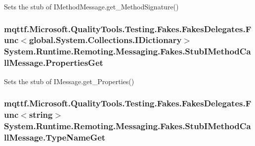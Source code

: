 Sets the stub of I\-Method\-Message.\-get\-\_\-\-Method\-Signature()

\hypertarget{class_system_1_1_runtime_1_1_remoting_1_1_messaging_1_1_fakes_1_1_stub_i_method_call_message_a7240607efeabfb449c6bad358b684064}{
\subsubsection[{Properties\-Get}]{\setlength{\rightskip}{0pt plus 5cm}mqttf.\-Microsoft.\-Quality\-Tools.\-Testing.\-Fakes.\-Fakes\-Delegates.\-Func$<$global.\-System.\-Collections.\-I\-Dictionary$>$ System.\-Runtime.\-Remoting.\-Messaging.\-Fakes.\-Stub\-I\-Method\-Call\-Message.\-Properties\-Get}}\label{class_system_1_1_runtime_1_1_remoting_1_1_messaging_1_1_fakes_1_1_stub_i_method_call_message_a7240607efeabfb449c6bad358b684064}


Sets the stub of I\-Message.\-get\-\_\-\-Properties()

\hypertarget{class_system_1_1_runtime_1_1_remoting_1_1_messaging_1_1_fakes_1_1_stub_i_method_call_message_adbd188105e61252edcdf9fa925a26815}{
\subsubsection[{Type\-Name\-Get}]{\setlength{\rightskip}{0pt plus 5cm}mqttf.\-Microsoft.\-Quality\-Tools.\-Testing.\-Fakes.\-Fakes\-Delegates.\-Func$<$string$>$ System.\-Runtime.\-Remoting.\-Messaging.\-Fakes.\-Stub\-I\-Method\-Call\-Message.\-Type\-Name\-Get}}\label{class_system_1_1_runtime_1_1_remoting_1_1_messaging_1_1_fakes_1_1_stub_i_method_call_message_adbd188105e61252edcdf9fa925a26815}


